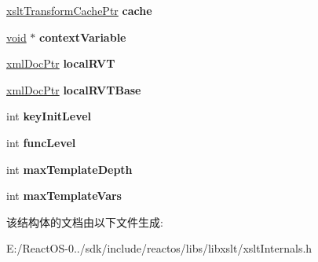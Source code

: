 \begin{DoxyCompactItemize}
\hyperlink{struct__xslt_transform_cache}{xslt\+Transform\+Cache\+Ptr} {\bfseries cache}
\item 
\mbox{\label{struct__xslt_transform_context_ac8e5bec8053d9bb0e3d5916902720f88}} 
\hyperlink{interfacevoid}{void} $\ast$ {\bfseries context\+Variable}
\item 
\mbox{\label{struct__xslt_transform_context_abe780477efc4a936d772f6e3c88acdd7}} 
\hyperlink{struct__xml_doc}{xml\+Doc\+Ptr} {\bfseries local\+R\+VT}
\item 
\mbox{\label{struct__xslt_transform_context_a856112b7685c887faf8665fa52a27bee}} 
\hyperlink{struct__xml_doc}{xml\+Doc\+Ptr} {\bfseries local\+R\+V\+T\+Base}
\item 
\mbox{\label{struct__xslt_transform_context_ae21f225617289d5f3803537547a36b30}} 
int {\bfseries key\+Init\+Level}
\item 
\mbox{\label{struct__xslt_transform_context_a05734495b7d124a30d1b0c8c874dcc26}} 
int {\bfseries func\+Level}
\item 
\mbox{\label{struct__xslt_transform_context_a9894e2bc9703ca23584e7c3542695d3c}} 
int {\bfseries max\+Template\+Depth}
\item 
\mbox{\label{struct__xslt_transform_context_a14c44d1000c2cf5bf1e5ba2630ec6e16}} 
int {\bfseries max\+Template\+Vars}
\end{DoxyCompactItemize}


该结构体的文档由以下文件生成\+:\begin{DoxyCompactItemize}
\item 
E\+:/\+React\+O\+S-\/0../sdk/include/reactos/libs/libxslt/xslt\+Internals.\+h\end{DoxyCompactItemize}
